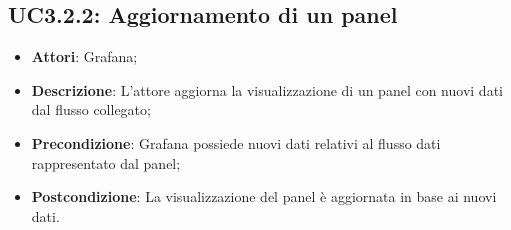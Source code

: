 \subsection{UC3.2.2: Aggiornamento di un panel}
\hypertarget{UC3.2.2}{}
\begin{itemize}
	\item \textbf{Attori}: Grafana;
	\item \textbf{Descrizione}: L'attore aggiorna la visualizzazione di un panel con nuovi dati dal flusso collegato;
	\item \textbf{Precondizione}: Grafana possiede nuovi dati relativi al flusso dati rappresentato dal panel;
	\item \textbf{Postcondizione}: La visualizzazione del panel è aggiornata in base ai nuovi dati.
\end{itemize}